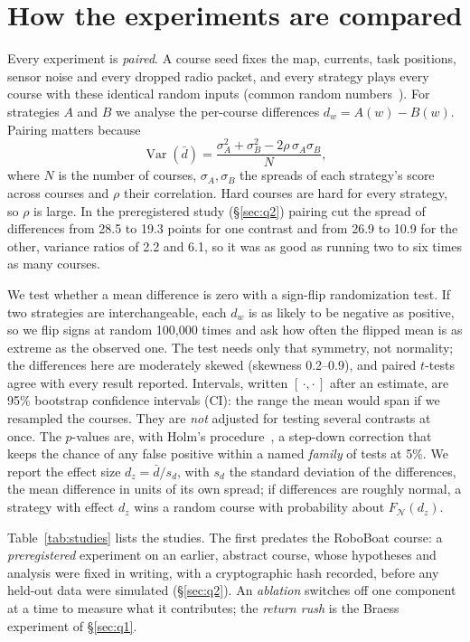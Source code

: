 \documentclass[11pt]{article}
\theoremstyle{definition}
\begin{document}
\section{How the experiments are compared}
\label{sec:stats}
Every experiment is \emph{paired}. A course seed fixes the map, currents, task positions, sensor noise and every dropped radio packet, and every strategy plays every course with these identical random inputs (common random numbers~\cite{yang1991}). For strategies $A$ and $B$ we analyse the per-course differences $d_w=A(w)-B(w)$. Pairing matters because
\[
\operatorname{Var}(\bar d)=\frac{\sigma_A^2+\sigma_B^2-2\rho\,\sigma_A\sigma_B}{N},
\]
where $N$ is the number of courses, $\sigma_A,\sigma_B$ the spreads of each strategy's score across courses and $\rho$ their correlation. Hard courses are hard for every strategy, so $\rho$ is large. In the preregistered study (\S\ref{sec:q2}) pairing cut the spread of differences from 28.5 to 19.3 points for one contrast and from 26.9 to 10.9 for the other, variance ratios of 2.2 and 6.1, so it was as good as running two to six times as many courses.

We test whether a mean difference is zero with a sign-flip randomization test. If two strategies are interchangeable, each $d_w$ is as likely to be negative as positive, so we flip signs at random 100{,}000 times and ask how often the flipped mean is as extreme as the observed one. The test needs only that symmetry, not normality; the differences here are moderately skewed (skewness 0.2--0.9), and paired $t$-tests agree with every result reported. Intervals, written $[\,\cdot,\cdot\,]$ after an estimate, are 95\% bootstrap confidence intervals (CI): the range the mean would span if we resampled the courses. They are \emph{not} adjusted for testing several contrasts at once. The $p$-values are, with Holm's procedure~\cite{holm1979}, a step-down correction that keeps the chance of any false positive within a named \emph{family} of tests at 5\%. We report the effect size $d_z=\bar d/s_d$, with $s_d$ the standard deviation of the differences, the mean difference in units of its own spread; if differences are roughly normal, a strategy with effect $d_z$ wins a random course with probability about $F_{\mathcal N}(d_z)$.

Table~\ref{tab:studies} lists the studies. The first predates the RoboBoat course: a \emph{preregistered} experiment on an earlier, abstract course, whose hypotheses and analysis were fixed in writing, with a cryptographic hash recorded, before any held-out data were simulated (\S\ref{sec:q2}). An \emph{ablation} switches off one component at a time to measure what it contributes; the \emph{return rush} is the Braess experiment of \S\ref{sec:q1}.
\end{document}
